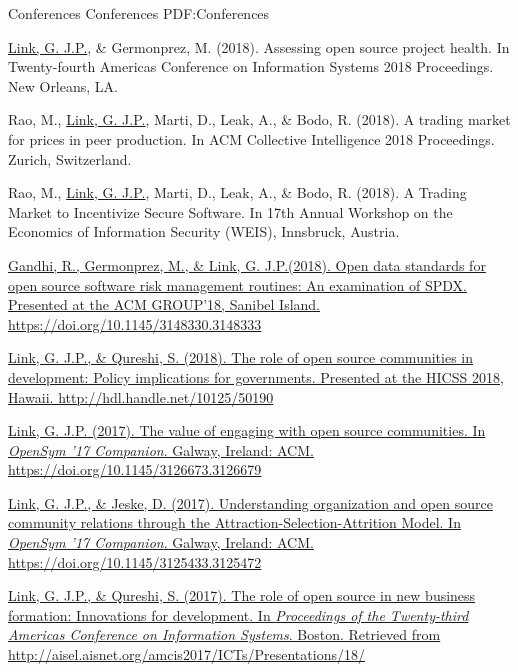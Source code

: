 \BigGap
\SubSection
{Conferences}
{Conferences}
{PDF:Conferences}

\begingroup
\renewcommand{\MaxNumberedItem}{[88]}


\Gap
\NumberedItem{[13]}
{
\underline{Link, G. J.P.}, \& Germonprez, M. (2018). Assessing open source project health. In Twenty-fourth Americas Conference on Information Systems 2018 Proceedings. New Orleans, LA.
}

\Gap
\NumberedItem{[12]}
{
Rao, M., \underline{Link, G. J.P.}, Marti, D., Leak, A., \& Bodo, R. (2018). A trading market for prices in peer production. In ACM Collective Intelligence 2018 Proceedings. Zurich, Switzerland.
}

\Gap
\NumberedItem{[11]}
{
Rao, M., \underline{Link, G. J.P.}, Marti, D., Leak, A., \& Bodo, R. (2018). A Trading Market to Incentivize Secure Software. In 17th Annual Workshop on the Economics of Information Security (WEIS), Innsbruck, Austria.
}

\Gap
\NumberedItem{[10]}
\href{https://doi.org/10.1145/3148330.3148333}
{
Gandhi, R., Germonprez, M., \& \underline{Link, G. J.P.}\footnotemark (2018). Open data standards for open source software risk management routines: An examination of SPDX. Presented at the ACM GROUP’18, Sanibel Island. \url{https://doi.org/10.1145/3148330.3148333}
}

\Gap
\NumberedItem{[9]}
\href{http://hdl.handle.net/10125/50190}
{
\underline{Link, G. J.P.}, \& Qureshi, S. (2018). The role of open source communities in development: Policy implications for governments. Presented at the HICSS 2018, Hawaii.
\url{http://hdl.handle.net/10125/50190}
}

\Gap
\NumberedItem{[8]}
\href{https://doi.org/10.1145/3126673.3126679}
{
\underline{Link, G. J.P.} (2017). The value of engaging with open source communities. In \textit{OpenSym ’17 Companion}. Galway, Ireland: ACM. \url{https://doi.org/10.1145/3126673.3126679}
}

\Gap
\NumberedItem{[7]}
\href{https://doi.org/10.1145/3125433.3125472}
{
\underline{Link, G. J.P.}, \& Jeske, D. (2017). Understanding organization and open source community relations through the Attraction-Selection-Attrition Model. In \textit{OpenSym ’17 Companion}. Galway, Ireland: ACM. \url{https://doi.org/10.1145/3125433.3125472}
}

\Gap
\NumberedItem{[6]}
\href{http://aisel.aisnet.org/amcis2017/ICTs/Presentations/18/}
{
\underline{Link, G. J.P.}, \& Qureshi, S. (2017). The role of open source in new business formation: Innovations for development. In \textit{Proceedings of the Twenty-third Americas Conference on Information Systems}. Boston. Retrieved from \url{http://aisel.aisnet.org/amcis2017/ICTs/Presentations/18/}
}


